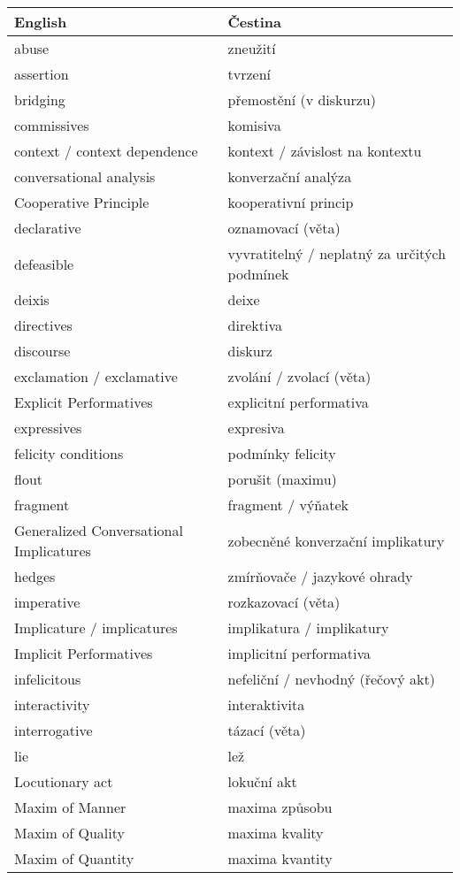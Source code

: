 \documentclass[a4paper,landscape,headrule,footrule,xetex]{foils}
\begin{document}
\begin{longtable}{ll}
  English & Čestina \\\hline \endhead
abuse & zneužití \\
assertion & tvrzení \\
bridging & přemostění (v diskurzu) \\
commissives & komisiva \\
context / context dependence & kontext / závislost na kontextu \\
conversational analysis & konverzační analýza \\
Cooperative Principle & kooperativní princip \\
declarative & oznamovací (věta) \\
defeasible & vyvratitelný / neplatný za určitých podmínek \\
deixis & deixe \\
directives & direktiva \\
discourse & diskurz \\
exclamation / exclamative & zvolání / zvolací (věta) \\
Explicit Performatives & explicitní performativa \\
expressives & expresiva \\
felicity conditions & podmínky felicity \\
flout & porušit (maximu) \\
fragment & fragment / výňatek \\
Generalized Conversational Implicatures & zobecněné konverzační implikatury \\
hedges & zmírňovače / jazykové ohrady \\
imperative & rozkazovací (věta) \\
Implicature / implicatures & implikatura / implikatury \\
Implicit Performatives & implicitní performativa \\
infelicitous & nefeliční / nevhodný (řečový akt) \\
interactivity & interaktivita \\
interrogative & tázací (věta) \\
lie & lež \\
Locutionary act & lokuční akt \\
Maxim of Manner & maxima způsobu \\
Maxim of Quality & maxima kvality \\
Maxim of Quantity & maxima kvantity \\

\end{longtable}
\end{document}
